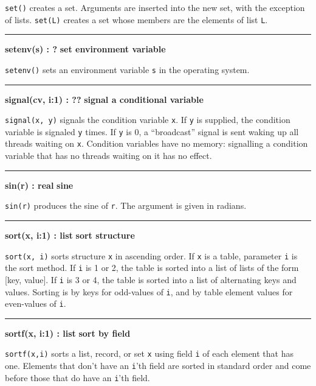 \noindent
{}\texttt{set()} creates a set. Arguments
are inserted into the new set, with the exception of lists.
\texttt{set(L)} creates a set whose members are the elements of list
\texttt{L}.

\bigskip\hrule\vspace{0.1cm}
\noindent
{\bf setenv(s) : ? } \hfill {\bf set environment variable}

\noindent
{}\texttt{setenv()} sets an environment variable
\texttt{s} in the operating system.

\bigskip\hrule\vspace{0.1cm}
\noindent
{\bf signal(cv, i:1) : ?? } \hfill {\bf signal a conditional variable}

\noindent
{}\texttt{signal(x, y)} signals the condition variable
\texttt{x}. If \texttt{y} is supplied, the condition variable is
signaled \texttt{y} times. If \texttt{y} is 0, a ``broadcast''
signal is sent waking up all threads waiting on \texttt{x}.
Condition variables have no memory: signalling a condition variable
that has no threads waiting on it has no effect.

\bigskip\hrule\vspace{0.1cm}
\noindent
{\bf sin(r) : real } \hfill {\bf sine}

\noindent
{}\texttt{sin(r)} produces the sine of
\texttt{r}. The argument is given in radians.

\bigskip\hrule\vspace{0.1cm}
\noindent
{\bf sort(x, i:1) : list } \hfill {\bf sort structure}

\noindent
{}\texttt{sort(x, i)} sorts structure \texttt{x} in
ascending order. If
\texttt{x} is a table, parameter \texttt{i} is the sort method. If
\texttt{i} is 1 or 2, the table is sorted into a list of lists of the
form [key, value]. If \texttt{i} is 3 or 4, the table is sorted into a
list of alternating keys and values. Sorting is by keys for odd-values
of \texttt{i}, and by table element values for even-values of
\texttt{i}.

\bigskip\hrule\vspace{0.1cm}
\noindent
{\bf sortf(x, i:1) : list } \hfill {\bf sort by field}

\noindent
{}\texttt{sortf(x,i)} sorts a list, record, or set
\texttt{x} using field \texttt{i} of each element that has one.
Elements that don't have an
\texttt{i}'th field are sorted in standard order and
come before those that do have an \texttt{i}'th field.

